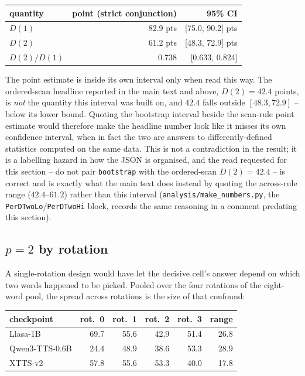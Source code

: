 \documentclass[11pt]{article}
\begin{document}
\begin{center}
\begin{tabular}{@{}lrr@{}}
\toprule
quantity & point (strict conjunction) & 95\% CI \\
\midrule
$D(1)$ & 82.9 pts & [75.0, 90.2] pts \\
$D(2)$ & 61.2 pts & [48.3, 72.9] pts \\
$D(2)/D(1)$ & 0.738 & [0.633, 0.824] \\
\bottomrule
\end{tabular}
\end{center}

\noindent The point estimate is inside its own interval only when read this
way. The ordered-scan headline reported in the main text and above, $D(2)=42.4$
points, is \emph{not} the quantity this interval was built on, and $42.4$
falls outside $[48.3,72.9]$ -- below its lower bound. Quoting the bootstrap
interval beside the scan-rule point estimate would therefore make the
headline number look like it misses its own confidence interval, when in fact
the two are answers to differently-defined statistics computed on the same
data. This is not a contradiction in the result; it is a labelling hazard in
how the JSON is organised, and the read requested for this section -- do not
pair \texttt{bootstrap} with the ordered-scan $D(2)=42.4$ -- is correct
and is exactly what the main text does instead by quoting the across-rule
range ($42.4$--$61.2$) rather than this interval (\texttt{analysis/make\_numbers.py},
the \texttt{PerDTwoLo}/\texttt{PerDTwoHi} block, records the same reasoning
in a comment predating this section).

\subsection{$p=2$ by rotation}

A single-rotation design would have let the decisive cell's answer depend on
which two words happened to be picked. Pooled over the four rotations of the
eight-word pool, the spread across rotations is the size of that confound:

\begin{center}
\begin{tabular}{@{}lrrrrr@{}}
\toprule
checkpoint & rot.\ 0 & rot.\ 1 & rot.\ 2 & rot.\ 3 & range \\
\midrule
Llasa-1B         & 69.7 & 55.6 & 42.9 & 51.4 & 26.8 \\
Qwen3-TTS-0.6B   & 24.4 & 48.9 & 38.6 & 53.3 & 28.9 \\
XTTS-v2          & 57.8 & 55.6 & 53.3 & 40.0 & 17.8 \\
\bottomrule
\end{tabular}
\end{center}
\end{document}
